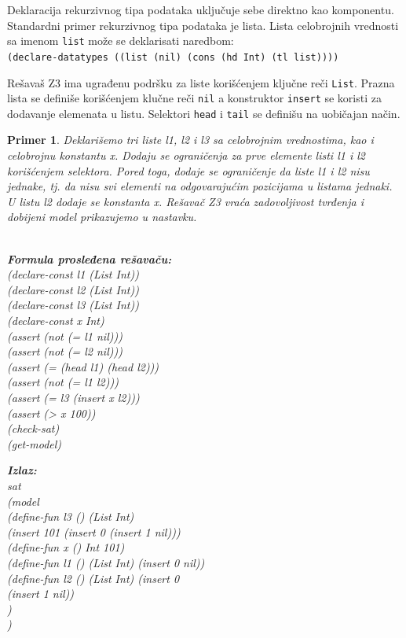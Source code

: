 \documentclass[12pt,oneside]{memoir}
\newcommand\tab[1][0.5cm]{\hspace*{#1}}
\newtheorem{primer}{Primer}
\begin{document}
Deklaracija rekurzivnog tipa podataka uključuje sebe direktno kao komponentu. Standardni primer rekurzivnog tipa podataka je lista. 
Lista celobrojnih vrednosti sa imenom \texttt{list} može se deklarisati naredbom:\\
\texttt{(declare-datatypes ((list (nil) (cons (hd Int) (tl list))))}
\par
Rešavaš Z3 ima ugrađenu podršku za liste korišćenjem ključne reči \texttt{List}.
Prazna lista se definiše korišćenjem klučne reči \texttt{nil} a konstruktor \texttt{insert} se koristi za dodavanje elemenata u listu. Selektori \texttt{head} i \texttt{tail} se definišu na uobičajan način.

\begin{primer} Deklarišemo tri liste l1, l2 i l3 sa celobrojnim vrednostima, kao i celobrojnu konstantu x. Dodaju se ograničenja za prve elemente listi l1 i l2 korišćenjem selektora. Pored toga, dodaje se ograničenje da liste l1 i l2 nisu jednake, tj. da nisu svi elementi na odgovarajućim pozicijama u listama jednaki. U listu l2 dodaje se konstanta x. Rešavač Z3 vraća zadovoljivost tvrđenja i dobijeni model prikazujemo u nastavku.
\\ \\
\begin{minipage}[b]{0.42\textwidth}
\textbf{Formula prosleđena rešavaču:}
\\(declare-const l1 (List Int))
\\(declare-const l2 (List Int))
\\(declare-const l3 (List Int))
\\(declare-const x Int)
\\(assert (not (= l1 nil)))
\\(assert (not (= l2 nil)))
\\(assert (= (head l1) (head l2)))
\\(assert (not (= l1 l2)))
\\(assert (= l3 (insert x l2)))
\\(assert (> x 100))
\\(check-sat)
\\(get-model)
\end{minipage}
\hspace{0.9cm}
\begin{minipage}[t]{0.55\textwidth}
\vspace{-7.84cm}
\textbf{Izlaz:}
\\sat 
\\(model 
\\\tab(define-fun l3 () (List Int) 
\\\tab(insert 101 (insert 0 (insert 1 nil)))
\\\tab(define-fun x () Int 101) 
\\\tab(define-fun l1 () (List Int) (insert 0 nil)) 
\\\tab(define-fun l2 () (List Int) (insert 0 
\\\tab\tab(insert 1 nil))
\\\tab)
\\) 
\end{minipage}


\end{primer}
\end{document}
